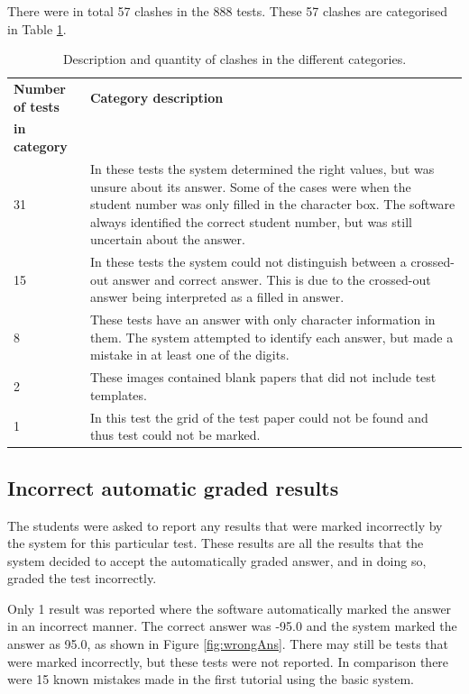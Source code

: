 There were in total 57 clashes in the 888 tests. These 57 clashes are categorised in Table \ref{tbl:TutClash}.
\begin{table}
  \centering
  \caption{Description and quantity of clashes in the different categories.} \label{tbl:TutClash}
\begin{tabular}{|p{3cm}|p{8cm}|}
\hline
\textbf{Number of tests} & \textbf{Category description}\\
\textbf{in category} &\\
\hline
31&In these tests the system determined the right values, but was unsure about its answer. Some of the cases were when the student number was only filled in the character box. The software always identified the correct student number, but was still uncertain about the answer.\\
\hline
15&In these tests the system could not distinguish between a crossed-out answer and correct answer. This is due to the crossed-out answer being interpreted as a filled in answer.\\
\hline
8&These tests have an answer with only character information in them. The system attempted to identify each answer, but made a mistake in at least one of the digits.\\
\hline
2&These images contained blank papers that did not include test templates.\\
\hline
1&In this test the grid of the test paper could not be found and thus test could not be marked.\\
\hline
\end{tabular}
\end{table}

\subsection{Incorrect automatic graded results}

The students were asked to report any results that were marked incorrectly by the system for this particular test. These results are all the results that the system decided to accept the automatically graded answer, and in doing so, graded the test incorrectly.

Only 1 result was reported where the software automatically marked the answer in an incorrect manner. The correct answer was -95.0 and the system marked the answer as 95.0, as shown in Figure \ref{fig:wrongAns}. There may still be tests that were marked incorrectly, but these tests were not reported. In comparison there were 15 known mistakes made in the first tutorial using the basic system.


